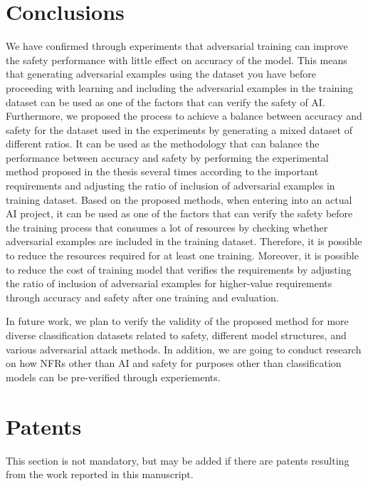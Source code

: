 \documentclass[journal,article,submit,moreauthors,pdftex]{Definitions/mdpi}
\begin{document}
\section{Conclusions}

We have confirmed through experiments that adversarial training can improve the safety performance with little effect on accuracy of the model.
This means that generating adversarial examples using the dataset you have before proceeding with learning and including the adversarial examples in the training dataset can be used as one of the factors that can verify the safety of AI.
Furthermore, we proposed the process to achieve a balance between accuracy and safety for the dataset used in the experiments by generating a mixed dataset of different ratios.
It can be used as the methodology that can balance the performance between accuracy and safety by performing the experimental method proposed in the thesis several times according to the important requirements and adjusting the ratio of inclusion of adversarial examples in training dataset.
Based on the proposed methods, when entering into an actual AI project, it can be used as one of the factors that can verify the safety before the training process that consumes a lot of resources by checking whether adversarial examples are included in the training dataset.
Therefore, it is possible to reduce the resources required for at least one training.
Moreover, it is possible to reduce the cost of training model that verifies the requirements by adjusting the ratio of inclusion of adversarial examples for higher-value requirements through accuracy and safety after one training and evaluation.

In future work, we plan to verify the validity of the proposed method for more diverse classification datasets related to safety, different model structures, and various adversarial attack methods.
In addition, we are going to conduct research on how NFRs other than AI and safety for purposes other than classification models can be pre-verified through experiements.

\section{Patents}

This section is not mandatory, but may be added if there are patents resulting from the work reported in this manuscript.
\end{document}
